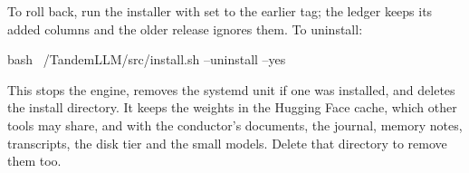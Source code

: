 To roll back, run the installer with  set to the earlier tag; the ledger keeps its added columns and the older release ignores them. To uninstall:

\begin{shell}
bash ~/TandemLLM/src/install.sh --uninstall --yes
\end{shell}

This stops the engine, removes the systemd unit if one was installed, and deletes the install directory. It keeps the weights in the Hugging Face cache, which other tools may share, and  with the conductor's documents, the journal, memory notes, transcripts, the disk tier and the small models. Delete that directory to remove them too.
